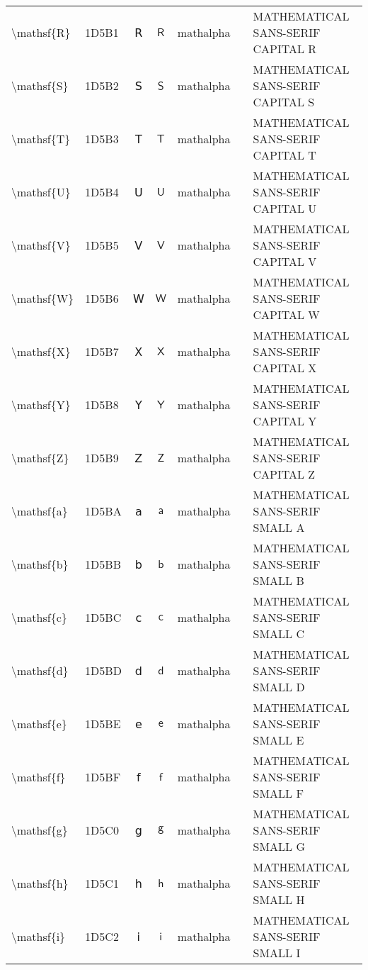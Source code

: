 \documentclass[a4paper,landscape]{article}
\begin{document}
\begin{longtable}{llcclll}
\textbackslash{}mathsf\{R\} & 1D5B1 & 𝖱 & $\mathsf{R}$ & mathalpha &  & MATHEMATICAL SANS-SERIF CAPITAL R \\
\textbackslash{}mathsf\{S\} & 1D5B2 & 𝖲 & $\mathsf{S}$ & mathalpha &  & MATHEMATICAL SANS-SERIF CAPITAL S \\
\textbackslash{}mathsf\{T\} & 1D5B3 & 𝖳 & $\mathsf{T}$ & mathalpha &  & MATHEMATICAL SANS-SERIF CAPITAL T \\
\textbackslash{}mathsf\{U\} & 1D5B4 & 𝖴 & $\mathsf{U}$ & mathalpha &  & MATHEMATICAL SANS-SERIF CAPITAL U \\
\textbackslash{}mathsf\{V\} & 1D5B5 & 𝖵 & $\mathsf{V}$ & mathalpha &  & MATHEMATICAL SANS-SERIF CAPITAL V \\
\textbackslash{}mathsf\{W\} & 1D5B6 & 𝖶 & $\mathsf{W}$ & mathalpha &  & MATHEMATICAL SANS-SERIF CAPITAL W \\
\textbackslash{}mathsf\{X\} & 1D5B7 & 𝖷 & $\mathsf{X}$ & mathalpha &  & MATHEMATICAL SANS-SERIF CAPITAL X \\
\textbackslash{}mathsf\{Y\} & 1D5B8 & 𝖸 & $\mathsf{Y}$ & mathalpha &  & MATHEMATICAL SANS-SERIF CAPITAL Y \\
\textbackslash{}mathsf\{Z\} & 1D5B9 & 𝖹 & $\mathsf{Z}$ & mathalpha &  & MATHEMATICAL SANS-SERIF CAPITAL Z \\
\textbackslash{}mathsf\{a\} & 1D5BA & 𝖺 & $\mathsf{a}$ & mathalpha &  & MATHEMATICAL SANS-SERIF SMALL A \\
\textbackslash{}mathsf\{b\} & 1D5BB & 𝖻 & $\mathsf{b}$ & mathalpha &  & MATHEMATICAL SANS-SERIF SMALL B \\
\textbackslash{}mathsf\{c\} & 1D5BC & 𝖼 & $\mathsf{c}$ & mathalpha &  & MATHEMATICAL SANS-SERIF SMALL C \\
\textbackslash{}mathsf\{d\} & 1D5BD & 𝖽 & $\mathsf{d}$ & mathalpha &  & MATHEMATICAL SANS-SERIF SMALL D \\
\textbackslash{}mathsf\{e\} & 1D5BE & 𝖾 & $\mathsf{e}$ & mathalpha &  & MATHEMATICAL SANS-SERIF SMALL E \\
\textbackslash{}mathsf\{f\} & 1D5BF & 𝖿 & $\mathsf{f}$ & mathalpha &  & MATHEMATICAL SANS-SERIF SMALL F \\
\textbackslash{}mathsf\{g\} & 1D5C0 & 𝗀 & $\mathsf{g}$ & mathalpha &  & MATHEMATICAL SANS-SERIF SMALL G \\
\textbackslash{}mathsf\{h\} & 1D5C1 & 𝗁 & $\mathsf{h}$ & mathalpha &  & MATHEMATICAL SANS-SERIF SMALL H \\
\textbackslash{}mathsf\{i\} & 1D5C2 & 𝗂 & $\mathsf{i}$ & mathalpha &  & MATHEMATICAL SANS-SERIF SMALL I \\

\end{longtable}
\end{document}
